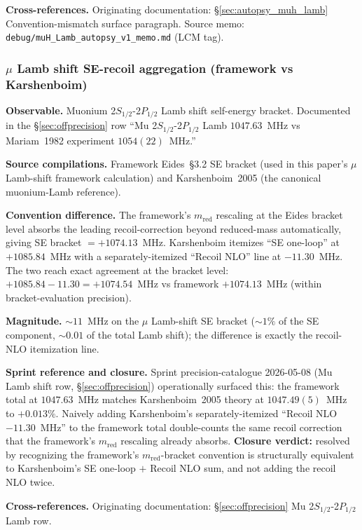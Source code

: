 \documentclass[11pt]{article}
\begin{document}
\textbf{Cross-references.}  Originating documentation:
\S\ref{sec:autopsy_muh_lamb} Convention-mismatch surface paragraph.
Source memo: \texttt{debug/muH\_Lamb\_autopsy\_v1\_memo.md} (LCM tag).

\subsubsection{$\mu$ Lamb shift SE-recoil aggregation (framework vs Karshenboim)}
\label{sec:conv_karshenboim_recoil}

\textbf{Observable.}  Muonium 2$S_{1/2}$-2$P_{1/2}$ Lamb shift
self-energy bracket.  Documented in the \S\ref{sec:offprecision} row
``Mu 2$S_{1/2}$-2$P_{1/2}$ Lamb $1047.63$~MHz vs Mariam~1982
experiment $1054(22)$~MHz.''

\textbf{Source compilations.}  Framework Eides~\S 3.2 SE bracket
(used in this paper's $\mu$ Lamb-shift framework calculation) and
Karshenboim~2005 (the canonical muonium-Lamb reference).

\textbf{Convention difference.}  The framework's $m_\text{red}$
rescaling at the Eides bracket level absorbs the leading
recoil-correction beyond reduced-mass automatically, giving
SE bracket $= +1074.13$~MHz.  Karshenboim itemizes ``SE one-loop''
at $+1085.84$~MHz with a separately-itemized ``Recoil NLO''
line at $-11.30$~MHz.  The two reach exact agreement at the bracket
level: $+1085.84 - 11.30 = +1074.54$~MHz vs framework $+1074.13$~MHz
(within bracket-evaluation precision).

\textbf{Magnitude.}  $\sim 11$~MHz on the $\mu$ Lamb-shift SE bracket
($\sim 1\%$ of the SE component, $\sim 0.01$ of the total Lamb shift);
the difference is exactly the recoil-NLO itemization line.

\textbf{Sprint reference and closure.}  Sprint precision-catalogue
2026-05-08 (Mu Lamb shift row, \S\ref{sec:offprecision}) operationally
surfaced this: the framework total at $1047.63$~MHz matches
Karshenboim~2005 theory at $1047.49(5)$~MHz to $+0.013\%$.  Naively
adding Karshenboim's separately-itemized ``Recoil NLO $-11.30$~MHz''
to the framework total double-counts the same recoil correction that
the framework's $m_\text{red}$ rescaling already absorbs.
\textbf{Closure verdict:} resolved by recognizing the framework's
$m_\text{red}$-bracket convention is structurally equivalent to
Karshenboim's SE one-loop $+$ Recoil NLO sum, and not adding the
recoil NLO twice.

\textbf{Cross-references.}  Originating documentation:
\S\ref{sec:offprecision} Mu 2$S_{1/2}$-2$P_{1/2}$ Lamb row.
\end{document}
